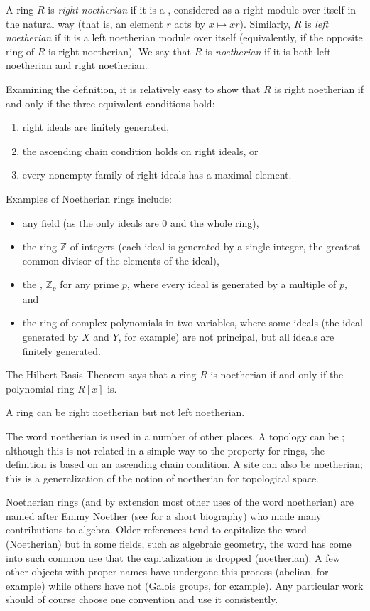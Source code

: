 \documentclass[12pt]{article}
\begin{document}
A ring $R$ is \emph{right noetherian} if it is a , considered as a right module over itself in the natural way (that is, an element $r$ acts by $x\mapsto xr$).  Similarly, $R$ is \emph{left noetherian} if it is a left noetherian module over itself (equivalently, if the opposite ring of $R$ is right noetherian). We say that $R$ is \emph{noetherian} if it is both left noetherian and right noetherian. 

Examining the definition, it is relatively easy to show that $R$ is right noetherian if and only if the three equivalent conditions hold:
\begin{enumerate}
\item right ideals are finitely generated,
\item the ascending chain condition holds on right ideals, or
\item every nonempty family of right ideals has a maximal element.
\end{enumerate}

Examples of Noetherian rings include:
\begin{itemize}
\item any field (as the only ideals are 0 and the whole ring),
\item the ring $\mathbb{Z}$ of integers (each ideal is generated by a single integer, the greatest common divisor of the elements of the ideal),
\item the , $\mathbb{Z}_p$ for any prime $p$, where every ideal is generated by a multiple of $p$, and
\item the ring of complex polynomials in two variables, where some ideals (the ideal generated by $X$ and $Y$, for example) are not principal, but all ideals are finitely generated.
\end{itemize}
The Hilbert Basis Theorem says that a ring $R$ is noetherian if and only if the polynomial ring $R[x]$ is.

A ring can be right noetherian but not left noetherian.

The word noetherian is used in a number of other places.  A topology can be ; although this is not related in a simple way to the property for rings, the definition is based on an ascending chain condition.  A site can also be noetherian; this is a generalization of the notion of noetherian for topological space.

Noetherian rings (and by extension most other uses of the word noetherian) are named after Emmy Noether (see  for a short biography) who made many contributions to algebra.  Older references tend to capitalize the word (Noetherian) but in some fields, such as algebraic geometry, the word has come into such common use that the capitalization is dropped (noetherian).  A few other objects with proper names have undergone this process (abelian, for example) while others have not (Galois groups, for example).  Any particular work should of course choose one convention and use it consistently.
\end{document}
